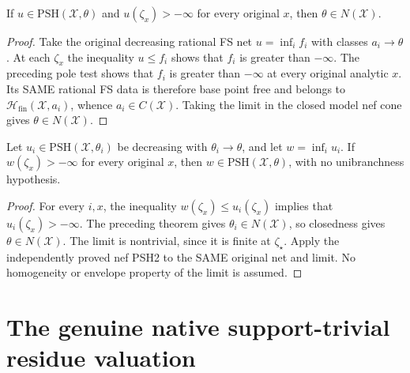 \begin{theorem}
\label{thm:seven-support-trivial-psh-nef}
\leanok
If $u\in\mathrm{PSH}(\mathcal X,\theta)$ and
$u(\zeta_x)>-\infty$ for every original $x$, then $\theta\in N(\mathcal X)$.
\end{theorem}
\begin{proof}
Take the original decreasing rational FS net $u=\inf_i f_i$ with classes
$a_i\to\theta$. At each $\zeta_x$ the inequality $u\le f_i$ shows that
$f_i$ is greater than $-\infty$. The preceding pole test shows that $f_i$
is greater than $-\infty$ at every original analytic $x$. Its SAME rational
FS data is therefore base point free and belongs to
$\mathcal H_{\mathrm{fin}}(\mathcal X,a_i)$, whence
$a_i\in C(\mathcal X)$. Taking the limit in the closed model nef cone gives
$\theta\in N(\mathcal X)$.
\end{proof}

\begin{theorem}
\label{thm:seven-support-trivial-limit-psh2}
\leanok
Let $u_i\in\mathrm{PSH}(\mathcal X,\theta_i)$ be decreasing with
$\theta_i\to\theta$, and let $w=\inf_i u_i$. If
$w(\zeta_x)>-\infty$ for every original $x$, then
$w\in\mathrm{PSH}(\mathcal X,\theta)$, with no unibranchness hypothesis.
\end{theorem}
\begin{proof}
For every $i,x$, the inequality $w(\zeta_x)\le u_i(\zeta_x)$ implies
that $u_i(\zeta_x)>-\infty$. The preceding theorem gives
$\theta_i\in N(\mathcal X)$, so closedness gives
$\theta\in N(\mathcal X)$. The limit is nontrivial, since it is finite at
$\zeta_{\star}$. Apply the independently proved nef PSH2 to the SAME original
net and limit. No homogeneity or envelope property of the limit is assumed.
\end{proof}

\section{The genuine native support-trivial residue valuation}


